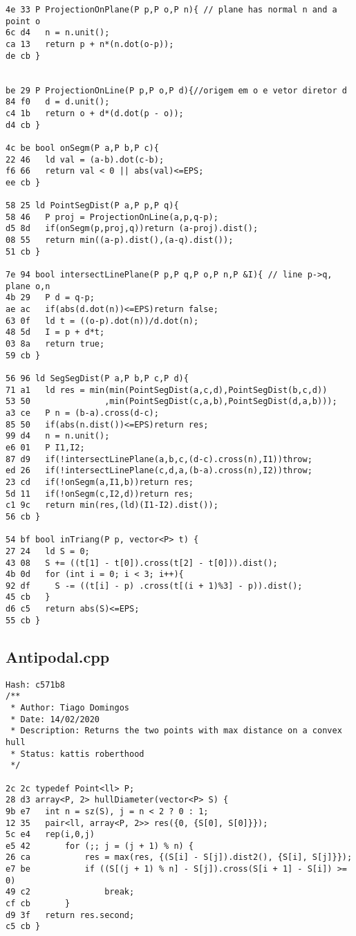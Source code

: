 \documentclass[11pt, a4paper, twoside]{article}
\begin{document}
\begin{lstlisting}
4e 33 P ProjectionOnPlane(P p,P o,P n){ // plane has normal n and a point o
6c d4   n = n.unit();
ca 13   return p + n*(n.dot(o-p));
de cb }


be 29 P ProjectionOnLine(P p,P o,P d){//origem em o e vetor diretor d
84 f0   d = d.unit();
c4 1b   return o + d*(d.dot(p - o));
d4 cb }

4c be bool onSegm(P a,P b,P c){
22 46   ld val = (a-b).dot(c-b);
f6 66   return val < 0 || abs(val)<=EPS;
ee cb }

58 25 ld PointSegDist(P a,P p,P q){
58 46   P proj = ProjectionOnLine(a,p,q-p);
d5 8d   if(onSegm(p,proj,q))return (a-proj).dist();
08 55   return min((a-p).dist(),(a-q).dist());
51 cb }

7e 94 bool intersectLinePlane(P p,P q,P o,P n,P &I){ // line p->q, plane o,n
4b 29   P d = q-p;
ae ac   if(abs(d.dot(n))<=EPS)return false;
63 0f   ld t = ((o-p).dot(n))/d.dot(n);
48 5d   I = p + d*t;
03 8a   return true;
59 cb }

56 96 ld SegSegDist(P a,P b,P c,P d){
71 a1   ld res = min(min(PointSegDist(a,c,d),PointSegDist(b,c,d))
53 50               ,min(PointSegDist(c,a,b),PointSegDist(d,a,b)));
a3 ce   P n = (b-a).cross(d-c);
85 50   if(abs(n.dist())<=EPS)return res;
99 d4   n = n.unit();
e6 01   P I1,I2;
87 d9   if(!intersectLinePlane(a,b,c,(d-c).cross(n),I1))throw;
ed 26   if(!intersectLinePlane(c,d,a,(b-a).cross(n),I2))throw;
23 cd   if(!onSegm(a,I1,b))return res;
5d 11   if(!onSegm(c,I2,d))return res;
c1 9c   return min(res,(ld)(I1-I2).dist());
56 cb }

54 bf bool inTriang(P p, vector<P> t) {
27 24   ld S = 0;
43 08   S += ((t[1] - t[0]).cross(t[2] - t[0])).dist();
4b 0d   for (int i = 0; i < 3; i++){
92 df     S -= ((t[i] - p) .cross(t[(i + 1)%3] - p)).dist();
45 cb   }
d6 c5   return abs(S)<=EPS;
55 cb }
\end{lstlisting}

\subsection{Antipodal.cpp}
\begin{lstlisting}
Hash: c571b8
/**
 * Author: Tiago Domingos
 * Date: 14/02/2020
 * Description: Returns the two points with max distance on a convex hull 
 * Status: kattis roberthood
 */

2c 2c typedef Point<ll> P;
28 d3 array<P, 2> hullDiameter(vector<P> S) {
9b e7 	int n = sz(S), j = n < 2 ? 0 : 1;
12 35 	pair<ll, array<P, 2>> res({0, {S[0], S[0]}});
5c e4 	rep(i,0,j)
e5 42 		for (;; j = (j + 1) % n) {
26 ca 			res = max(res, {(S[i] - S[j]).dist2(), {S[i], S[j]}});
e7 be 			if ((S[(j + 1) % n] - S[j]).cross(S[i + 1] - S[i]) >= 0)
49 c2 				break;
cf cb 		}
d9 3f 	return res.second;
c5 cb }
\end{lstlisting}
\end{document}
